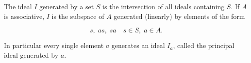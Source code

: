 The ideal $I$ generated by a set $S$ is the intersection of all ideals containing $S$. If $A$ is associative, $I$ is the subspace of $A$ generated (linearly) by elements of the form

$$s, \; a s, \; s a \quad s \in S, \; a \in A.$$

In particular every single element $a$ generates an ideal $I_a$, called the principal ideal generated by $a$.
